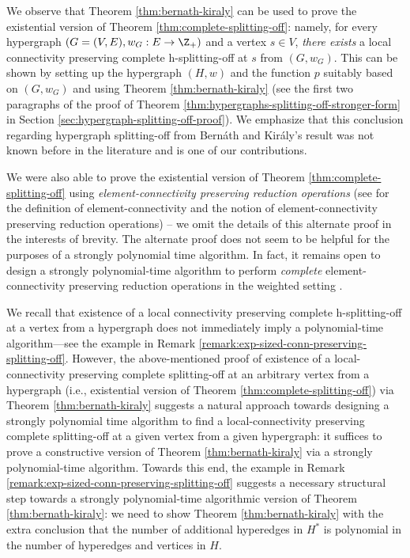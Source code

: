 We observe that Theorem \ref{thm:bernath-kiraly} can be used to prove the existential version of Theorem \ref{thm:complete-splitting-off}: namely, for every hypergraph $(G=(V, E), w_G: E\rightarrow \Z_+)$ and a vertex $s\in V$, \emph{there exists} a local connectivity preserving complete h-splitting-off at $s$ from $(G,w_G)$. This can be shown by setting up the hypergraph $(H,w)$ and the function $p$ suitably based on $(G,w_G)$ and using Theorem \ref{thm:bernath-kiraly} (see the first two paragraphs of the proof of Theorem \ref{thm:hypergraphs-splitting-off-stronger-form} in Section \ref{sec:hypergraph-splitting-off-proof}). 
We emphasize that this conclusion regarding hypergraph splitting-off from Bern\'{a}th and Kir\'{a}ly's result was not known before in the literature and is one of our contributions. 
\begin{remark}
    We were also able to prove the existential version of Theorem \ref{thm:complete-splitting-off} using \emph{element-connectivity preserving reduction operations} \cite{BCCKM-private} (see \cite{CK14} for the definition of element-connectivity and the notion of element-connectivity preserving reduction operations) -- we omit the details of this alternate proof in the interests of brevity. The alternate proof does not seem to be helpful for the purposes of a strongly polynomial time algorithm. In fact, it remains open to design a strongly polynomial-time algorithm to perform \emph{complete} element-connectivity preserving reduction operations in the weighted setting \cite{CK14}. 
\end{remark}

We recall that existence of a local connectivity preserving complete h-splitting-off at a vertex from a hypergraph does not immediately imply a polynomial-time algorithm---see the example in Remark \ref{remark:exp-sized-conn-preserving-splitting-off}. 
However, the above-mentioned proof of 
existence of a local-connectivity preserving complete splitting-off at an arbitrary vertex from a hypergraph (i.e., existential version of Theorem \ref{thm:complete-splitting-off}) 
via Theorem \ref{thm:bernath-kiraly} suggests a natural approach towards designing a strongly polynomial time algorithm to find a local-connectivity preserving complete splitting-off at a given vertex from a given hypergraph: it suffices to prove a constructive version of Theorem \ref{thm:bernath-kiraly} via a strongly polynomial-time algorithm. Towards this end, the example in Remark \ref{remark:exp-sized-conn-preserving-splitting-off} suggests a necessary structural step towards a strongly polynomial-time algorithmic version of Theorem \ref{thm:bernath-kiraly}: we need to show Theorem \ref{thm:bernath-kiraly} with the extra conclusion that the number of additional hyperedges in $H^*$ is polynomial in the number of hyperedges and vertices in $H$. 

